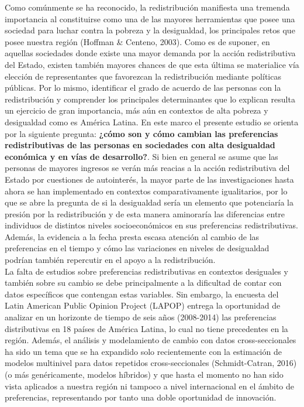 \documentclass[12pt,letterpaper]{article}
\begin{document}
Como comúnmente se ha reconocido, la redistribución manifiesta una tremenda importancia al constituirse como una de las mayores herramientas que posee una sociedad para luchar contra la pobreza y la desigualdad, los principales retos que posee nuestra región (Hoffman \& Centeno, 2003). Como es de suponer, en aquellas sociedades donde existe una mayor demanda por la acción redistributiva del Estado, existen también mayores chances de que esta última se materialice vía elección de representantes que favorezcan la redistribución mediante políticas públicas. Por lo mismo, identificar el grado de acuerdo de las personas con la redistribución y comprender los principales determinantes que lo explican resulta un ejercicio de gran importancia, más aún en contextos de alta pobreza y desigualdad como es América Latina. En este marco el presente estudio se orienta por la siguiente pregunta: \textbf{¿cómo son y cómo cambian las preferencias redistributivas de las personas en sociedades con alta desigualdad económica y en vías de desarrollo?}. Si bien en general se asume que las personas de mayores ingresos se verán más reacias a la acción redistributiva del Estado por cuestiones de autointerés, la mayor parte de las investigaciones hasta ahora se han implementado en contextos comparativamente igualitarios, por lo que se abre la pregunta de si la desigualdad sería un elemento que potenciaría la presión por la redistribución y de esta manera aminoraría las diferencias entre individuos de distintos niveles socioeconómicos en sus preferencias redistributivas. Además, la evidencia a la fecha presta escasa atención al cambio de las preferencias en el tiempo y cómo las variaciones en niveles de desigualdad podrían también repercutir en el apoyo a la redistribución. \\

La falta de estudios sobre preferencias redistributivas en contextos desiguales y también sobre su cambio se debe principalmente a la dificultad de contar con datos específicos que contengan estas variables. Sin embargo, la encuesta del Latin American Public Opinion Project (LAPOP) entrega la oportunidad de analizar en un horizonte de tiempo de seis años (2008-2014) las preferencias distributivas en 18 países de América Latina, lo cual no tiene precedentes en la región. Además, el análisis y modelamiento de cambio con datos cross-seccionales ha sido un tema que se ha expandido solo recientemente con la estimación de modelos multinivel para datos repetidos cross-seccionales (Schmidt-Catran, 2016) (o más genéricamente, modelos híbridos) y que hasta el momento no han sido vista aplicados a nuestra región ni tampoco a nivel internacional en el ámbito de preferencias, representando por tanto una doble oportunidad de innovación.\\
\end{document}
